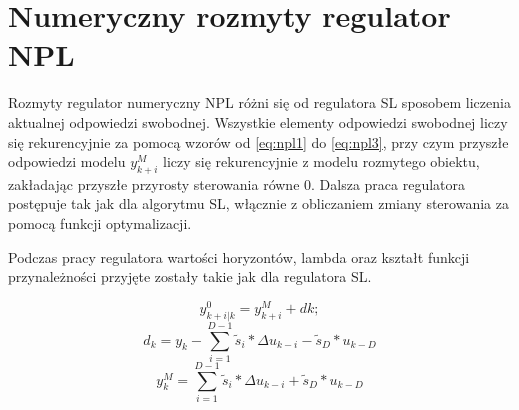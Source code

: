 \chapter{Numeryczny rozmyty regulator NPL}
	Rozmyty regulator numeryczny NPL różni się od regulatora SL sposobem liczenia aktualnej odpowiedzi swobodnej. Wszystkie elementy odpowiedzi swobodnej liczy się rekurencyjnie za pomocą wzorów od \ref{eq:npl1} do \ref{eq:npl3}, przy czym przyszłe odpowiedzi modelu $y_{k+i}^M$ liczy się rekurencyjnie z modelu rozmytego obiektu, zakładając przyszłe przyrosty sterowania równe 0.	Dalsza praca regulatora postępuje tak jak dla algorytmu SL, włącznie z obliczaniem zmiany sterowania za pomocą funkcji optymalizacji.
	
	Podczas pracy regulatora wartości horyzontów, lambda oraz kształt funkcji przynależności przyjęte zostały takie jak dla regulatora SL.

	\begin{equation}
		y_{k+i|k}^0=y_{k+i}^M+dk;
		\label{eq:npl1}
	\end{equation}
	\begin{equation}
		d_k = y_k-\sum_{i=1}^{D-1}\tilde{s}_i*\Delta u_{k-i}-\tilde{s}_D*u_{k-D}
		\label{eq:npl2}
	\end{equation}
	\begin{equation}
		y_{k}^M = \sum_{i=1}^{D-1}\tilde{s}_i*\Delta u_{k-i}+\tilde{s}_D*u_{k-D}
		\label{eq:npl3}
	\end{equation}